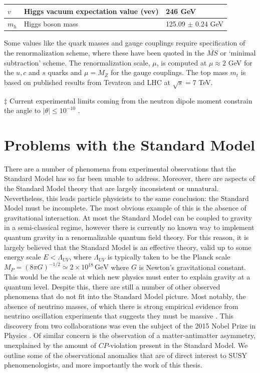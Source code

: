 \begin{threeparttable}
\begin{tabular}{|l|l|l|}
		$v$          & Higgs vacuum expectation value (\acrshort{vev}) & 246 GeV    \\ \hline
		$m_h$        & Higgs boson mass                                & 125.09 $\pm$ 0.24 GeV \\ \hline
	\end{tabular}
	\begin{tablenotes}
		\item[\textdagger] {\smaller Some values like the quark masses and gauge couplings require specification of the renormalization scheme, where these have been quoted in the $\overline{MS}$ or `minimal subtraction' \cite{RN513, RN514} scheme. The renormalization scale, $\mu$, is computed at $\mu \approx 2$ GeV for the $u,c$ and $s$ quarks and $\mu=M_Z$ for the gauge couplings. The top mass $m_t$ is based on published results from Tevatron and LHC at $\sqrt{s}=7$ TeV.}
		\item[$\ddag$] {\smaller Current experimental limits coming from the neutron dipole moment constrain the angle to $|\theta|\leq10^{-10}$ \cite{RN496}.}
	\end{tablenotes}
\end{threeparttable}

\section{Problems with the Standard Model}
\label{sec:SMprob}

There are a number of phenomena from experimental observations that the Standard Model has so far been unable to address. Moreover, there are aspects of the Standard Model theory that are largely inconsistent or unnatural. Nevertheless, this leads particle physicists to the same conclusion: the Standard Model must be incomplete. The most obvious example of this is the absence of gravitational interaction. At most the Standard Model can be coupled to gravity in a semi-classical regime, however there is currently no known way to implement quantum gravity in a renormalizable quantum field theory. For this reason, it is largely believed that the Standard Model is an effective theory, valid up to some energy scale $E<\Lambda_{UV}$, where $\Lambda_{UV}$ is typically taken to be the Planck scale $M_{P}=(8 \pi G)^{-1/2} \simeq 2\times 10^{18}\,\text{GeV}$ where $G$ is Newton's gravitational constant. This would be the scale at which new physics must enter to explain gravity at a quantum level. Despite this, there are still a number of other observed phenomena that do not fit into the Standard Model picture. Most notably, the absence of neutrino masses, of which there is strong empirical evidence from neutrino oscillation experiments \cite{RN529, RN530, RN531, RN532, RN533} that suggests they must be massive \cite{RN493}. This discovery from two collaborations \cite{RN490,RN492} was even the subject of the 2015 Nobel Prize in Physics \cite{RN491}. Of similar concern is the observation of a matter-antimatter asymmetry, unexplained by the amount of $CP$-violation present in the Standard Model. We outline some of the observational anomalies that are of direct interest to SUSY phenomenologists, and more importantly the work of this thesis.

